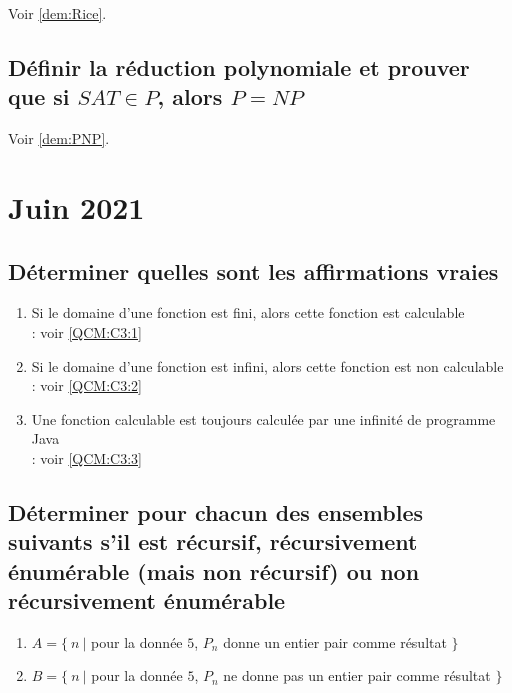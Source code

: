 Voir \ref{dem:Rice}.

\subsection*{Définir la réduction polynomiale et prouver que si $SAT \in P$, alors $P = NP$}

Voir \ref{dem:PNP}.

\newpage
\section{Juin 2021}

\subsection*{Déterminer quelles sont les affirmations vraies}

\begin{enumerate}
\item Si le domaine d'une fonction est fini, alors cette fonction est calculable\\
	 : voir \ref{QCM:C3:1}
\item Si le domaine d'une fonction est infini, alors cette fonction est non calculable\\
	 : voir \ref{QCM:C3:2}
\item Une fonction calculable est toujours calculée par une infinité de programme Java\\
	 : voir \ref{QCM:C3:3}
\end{enumerate}

\subsection*{Déterminer pour chacun des ensembles suivants s'il est récursif, récursivement énumérable (mais non récursif) ou non récursivement énumérable}

\begin{enumerate}
\item $A = \{\ n\ |$ pour la donnée $5$, $P_n$ donne un entier pair comme résultat $\}$\\
\item $B = \{\ n\ |$ pour la donnée $5$, $P_n$ ne donne pas un entier pair comme résultat $\}$\\
\end{enumerate}

